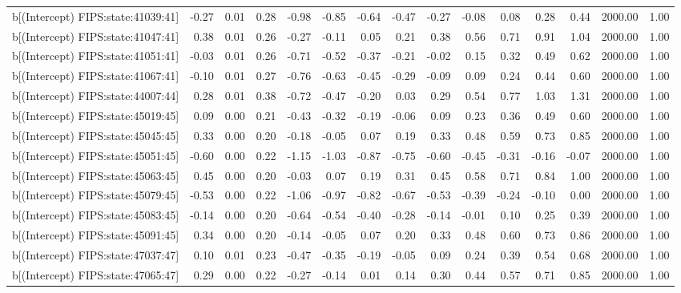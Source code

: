 \begin{table}[ht]
\begin{tabular}{rrrrrrrrrrrrrrr}
  b[(Intercept) FIPS:state:41039:41] & -0.27 & 0.01 & 0.28 & -0.98 & -0.85 & -0.64 & -0.47 & -0.27 & -0.08 & 0.08 & 0.28 & 0.44 & 2000.00 & 1.00 \\ 
  b[(Intercept) FIPS:state:41047:41] & 0.38 & 0.01 & 0.26 & -0.27 & -0.11 & 0.05 & 0.21 & 0.38 & 0.56 & 0.71 & 0.91 & 1.04 & 2000.00 & 1.00 \\ 
  b[(Intercept) FIPS:state:41051:41] & -0.03 & 0.01 & 0.26 & -0.71 & -0.52 & -0.37 & -0.21 & -0.02 & 0.15 & 0.32 & 0.49 & 0.62 & 2000.00 & 1.00 \\ 
  b[(Intercept) FIPS:state:41067:41] & -0.10 & 0.01 & 0.27 & -0.76 & -0.63 & -0.45 & -0.29 & -0.09 & 0.09 & 0.24 & 0.44 & 0.60 & 2000.00 & 1.00 \\ 
  b[(Intercept) FIPS:state:44007:44] & 0.28 & 0.01 & 0.38 & -0.72 & -0.47 & -0.20 & 0.03 & 0.29 & 0.54 & 0.77 & 1.03 & 1.31 & 2000.00 & 1.00 \\ 
  b[(Intercept) FIPS:state:45019:45] & 0.09 & 0.00 & 0.21 & -0.43 & -0.32 & -0.19 & -0.06 & 0.09 & 0.23 & 0.36 & 0.49 & 0.60 & 2000.00 & 1.00 \\ 
  b[(Intercept) FIPS:state:45045:45] & 0.33 & 0.00 & 0.20 & -0.18 & -0.05 & 0.07 & 0.19 & 0.33 & 0.48 & 0.59 & 0.73 & 0.85 & 2000.00 & 1.00 \\ 
  b[(Intercept) FIPS:state:45051:45] & -0.60 & 0.00 & 0.22 & -1.15 & -1.03 & -0.87 & -0.75 & -0.60 & -0.45 & -0.31 & -0.16 & -0.07 & 2000.00 & 1.00 \\ 
  b[(Intercept) FIPS:state:45063:45] & 0.45 & 0.00 & 0.20 & -0.03 & 0.07 & 0.19 & 0.31 & 0.45 & 0.58 & 0.71 & 0.84 & 1.00 & 2000.00 & 1.00 \\ 
  b[(Intercept) FIPS:state:45079:45] & -0.53 & 0.00 & 0.22 & -1.06 & -0.97 & -0.82 & -0.67 & -0.53 & -0.39 & -0.24 & -0.10 & 0.00 & 2000.00 & 1.00 \\ 
  b[(Intercept) FIPS:state:45083:45] & -0.14 & 0.00 & 0.20 & -0.64 & -0.54 & -0.40 & -0.28 & -0.14 & -0.01 & 0.10 & 0.25 & 0.39 & 2000.00 & 1.00 \\ 
  b[(Intercept) FIPS:state:45091:45] & 0.34 & 0.00 & 0.20 & -0.14 & -0.05 & 0.07 & 0.20 & 0.33 & 0.48 & 0.60 & 0.73 & 0.86 & 2000.00 & 1.00 \\ 
  b[(Intercept) FIPS:state:47037:47] & 0.10 & 0.01 & 0.23 & -0.47 & -0.35 & -0.19 & -0.05 & 0.09 & 0.24 & 0.39 & 0.54 & 0.68 & 2000.00 & 1.00 \\ 
  b[(Intercept) FIPS:state:47065:47] & 0.29 & 0.00 & 0.22 & -0.27 & -0.14 & 0.01 & 0.14 & 0.30 & 0.44 & 0.57 & 0.71 & 0.85 & 2000.00 & 1.00 \\ 

\end{tabular}
\end{table}

